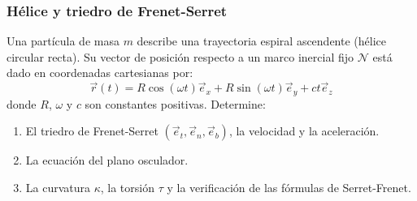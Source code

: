 \subsubsection{Hélice y triedro de Frenet-Serret}
Una partícula de masa $m$ describe una trayectoria espiral ascendente (hélice circular recta). Su vector de posición respecto a un marco inercial fijo $\mathcal{N}$ está dado en coordenadas cartesianas por:
$$\vec{r}(t) = R \cos(\omega t)\vec{e}_x + R \sin(\omega t)\vec{e}_y + c t \vec{e}_z$$
donde $R$, $\omega$ y $c$ son constantes positivas. Determine:
\begin{enumerate}
    \item El triedro de Frenet-Serret $(\vec{e}_t, \vec{e}_n, \vec{e}_b)$, la velocidad y la aceleración.
    \item La ecuación del plano osculador.
    \item La curvatura $\kappa$, la torsión $\tau$ y la verificación de las fórmulas de Serret-Frenet.
\end{enumerate}

